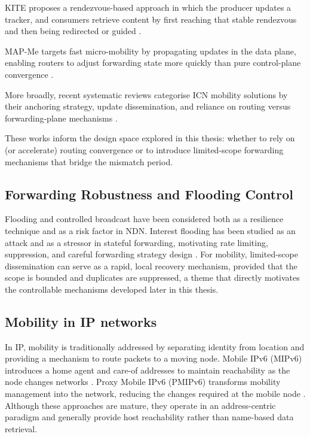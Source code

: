 KITE proposes a rendezvous-based approach in which the producer updates a tracker, and consumers retrieve content by first reaching that stable rendezvous and then being redirected or guided \cite{zhang:2018:kite}.

MAP-Me targets fast micro-mobility by propagating updates in the data plane, enabling routers to adjust forwarding state more quickly than pure control-plane convergence \cite{auge:2016:map-me,auge:2018:map-me}.

More broadly, recent systematic reviews categorise ICN mobility solutions by their anchoring strategy, update dissemination, and reliance on routing versus forwarding-plane mechanisms \cite{abrar:2023:systematic}.

These works inform the design space explored in this thesis: whether to rely on (or accelerate) routing convergence or to introduce limited-scope forwarding mechanisms that bridge the mismatch period.

\subsection{Forwarding Robustness and Flooding Control}
Flooding and controlled broadcast have been considered both as a resilience technique and as a risk factor in NDN. Interest flooding has been studied as an attack and as a stressor in stateful forwarding, motivating rate limiting, suppression, and careful forwarding strategy design \cite{afanasyev:2013:interest-flooding}. For mobility, limited-scope dissemination can serve as a rapid, local recovery mechanism, provided that the scope is bounded and duplicates are suppressed, a theme that directly motivates the controllable mechanisms developed later in this thesis.

\subsection{Mobility in IP networks}
In IP, mobility is traditionally addressed by separating identity from location and providing a mechanism to route packets to a moving node. Mobile IPv6 (MIPv6) introduces a home agent and care-of addresses to maintain reachability as the node changes networks \cite{johnson:2004:mipv6}. Proxy Mobile IPv6 (PMIPv6) transforms mobility management into the network, reducing the changes required at the mobile node \cite{gundavelli:2008:pmipv6}. Although these approaches are mature, they operate in an address-centric paradigm and generally provide host reachability rather than name-based data retrieval.

